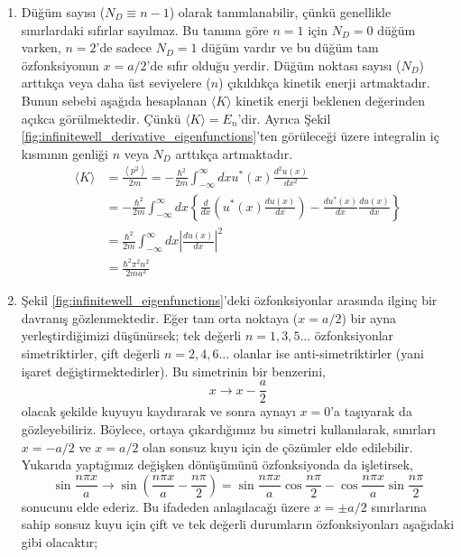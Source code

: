 \documentclass[00_kitap.tex]{subfiles}
\begin{document}
\begin{enumerate}
	
	\item Düğüm sayısı ($N_D \equiv n-1$) olarak tanımlanabilir, çünkü genellikle sınırlardaki sıfırlar sayılmaz. Bu tanıma göre $n=1$ için $N_D=0$ düğüm varken, $n=2$'de sadece $N_D=1$ düğüm vardır ve bu düğüm tam özfonksiyonun $x=a/2$'de sıfır olduğu yerdir. Düğüm noktası sayısı ($N_D$) arttıkça veya daha üst seviyelere ($n$) çıkıldıkça kinetik enerji artmaktadır. Bunun sebebi aşağıda hesaplanan $\langle K \rangle $ kinetik enerji beklenen değerinden açıkca görülmektedir. Çünkü $\langle K \rangle = E_n$'dir. Ayrıca Şekil \ref{fig:infinitewell_derivative_eigenfunctions}'ten görüleceği üzere integralin iç kısmının genliği $n$ veya $N_D$ arttıkça artmaktadır.
	\begin{equation}
	\begin{aligned} 
	\langle K \rangle 
	& = \frac { \left\langle p ^ { 2 } \right\rangle } { 2 m } = - \frac { \hbar ^ { 2 } } { 2 m } \int _ { - \infty } ^ { \infty } d x u ^ { * } ( x ) \frac { d ^ { 2 } u ( x ) } { d x ^ { 2 } } \\ 
	& = - \frac { \hbar ^ { 2 } } { 2 m } \int _ { - \infty } ^ { \infty } d x \left\{ \frac { d } { d x } \left( u ^ { * } ( x ) \frac { d u ( x ) } { d x } \right) - \frac { d u ^ { * } ( x ) } { d x } \frac { d u ( x ) } { d x } \right\} \\ 
	& = \frac { \hbar ^ { 2 } } { 2 m } \int _ { - \infty } ^ { \infty } d x \left| \frac { d u ( x ) } { d x } \right| ^ { 2 } \\
	&= \frac { \hbar ^ { 2 } \pi ^ { 2 } n ^ { 2 } } { 2 m a ^ { 2 } }
	\end{aligned}
	\end{equation}
		
	
	\item Şekil \ref{fig:infinitewell_eigenfunctions}'deki özfonksiyonlar arasında ilginç bir davranış gözlenmektedir. Eğer tam orta noktaya ($x=a/2$) bir ayna yerleştirdiğimizi düşünürsek; tek değerli $n=1, 3, 5 \ldots$ özfonksiyonlar simetriktirler, çift değerli $n=2, 4, 6 \ldots$ olanlar ise anti-simetriktirler (yani işaret değiştirmektedirler). Bu simetrinin bir benzerini, 
	\begin{equation*}
	x \rightarrow x - \frac { a } { 2 }
	\end{equation*}
	olacak şekilde kuyuyu kaydırarak ve sonra aynayı $x=0$'a taşıyarak da gözleyebiliriz. Böylece, ortaya çıkardığımız bu simetri kullanılarak, sınırları $x=-a/2$ ve $x=a/2$ olan sonsuz kuyu için de çözümler elde edilebilir. Yukarıda yaptığımız değişken dönüşümünü özfonksiyonda da işletirsek,
	\begin{equation}
	\sin \frac { n \pi x } { a } \rightarrow \sin \left( \frac { n \pi x } { a } - \frac { n \pi } { 2 } \right) = \sin \frac { n \pi x } { a } \cos \frac { n \pi } { 2 } - \cos \frac { n \pi x } { a } \sin \frac { n \pi } { 2 }
	\end{equation}
	sonucunu elde ederiz. Bu ifadeden anlaşılacağı üzere $x=\pm a/2$ sınırlarına sahip sonsuz kuyu için çift ve tek değerli durumların özfonksiyonları aşağıdaki gibi olacaktır;
	

\end{enumerate}
\end{document}
